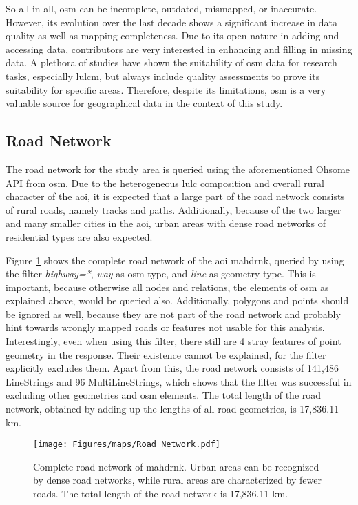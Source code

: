 So all in all, \gls{osm} can be incomplete, outdated, mismapped, or inaccurate. However, its evolution over the last decade shows a significant increase in data quality as well as mapping completeness. Due to its open nature in adding and accessing data, contributors are very interested in enhancing and filling in missing data. A plethora of studies have shown the suitability of \gls{osm} data for research tasks, especially \gls{lulcm}, but always include quality assessments to prove its suitability for specific areas. Therefore, despite its limitations, \gls{osm} is a very valuable source for geographical data in the context of this study.

\subsection{Road Network}
\label{subsec:roadnetwork}

The road network for the study area is queried using the aforementioned Ohsome API \autocite{Raifer.Troilo.ea2019} from \gls{osm}. Due to the heterogeneous \gls{lulc} composition and overall rural character of the \gls{aoi}, it is expected that a large part of the road network consists of rural roads, namely tracks and paths. Additionally, because of the two larger and many smaller cities in the \gls{aoi}, urban areas with dense road networks of residential types are also expected. 

Figure \ref{fig:roadnetwork} shows the complete road network of the \gls{aoi} \gls{mahdrnk}, queried by using the filter \emph{highway=*}, \emph{way} as \gls{osm} type, and \emph{line} as geometry type. This is important, because otherwise all nodes and relations, the elements of \gls{osm} as explained above, would be queried also. Additionally, polygons and points should be ignored as well, because they are not part of the road network and probably hint towards wrongly mapped roads or features not usable for this analysis. Interestingly, even when using this filter, there still are 4 stray features of point geometry in the response. Their existence cannot be explained, for the filter explicitly excludes them. Apart from this, the road network consists of 141,486 LineStrings and 96 MultiLineStrings, which shows that the filter was successful in excluding other geometries and \gls{osm} elements. The total length of the road network, obtained by adding up the lengths of all road geometries, is 17,836.11 km.

\begin{figure}[htb]
    \centering
    \texttt{[image: Figures/maps/Road Network.pdf]}
    \caption[Road Network of ]{Complete road network of \gls{mahdrnk}. Urban areas can be recognized by dense road networks, while rural areas are characterized by fewer roads. The total length of the road network is 17,836.11 km.}
    \label{fig:roadnetwork}
\end{figure}

